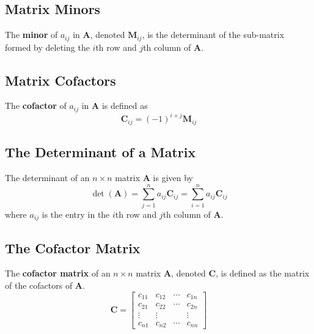 \documentclass{article}
\begin{document}
\subsection{Matrix Minors}
\begin{definition}
    The \textbf{minor} of \(a_{ij}\) in \(\symbf{A}\), denoted
    \(\symbf{M}_{ij}\), is the determinant of the sub-matrix formed by deleting
    the \(i\)th row and \(j\)th column of \(\symbf{A}\).
\end{definition}
\subsection{Matrix Cofactors}
\begin{definition}
    The \textbf{cofactor} of \(a_{ij}\) in \(\symbf{A}\) is defined as
    \begin{equation*}
        \symbf{C}_{ij} = \left( -1 \right)^{i+j} \symbf{M}_{ij}
    \end{equation*}
\end{definition}
\subsection{The Determinant of a Matrix}
\begin{theorem}
    The determinant of an \(n\times n\) matrix \(\symbf{A}\) is given
    by
    \begin{equation*}
        \det{\left( \symbf{A} \right)} = \sum_{j=1}^n a_{ij}\symbf{C}_{ij} = \sum_{i=1}^n a_{ij}\symbf{C}_{ij}
    \end{equation*}
    where \(a_{ij}\) is the entry in the \(i\)th row and \(j\)th column
    of \(\symbf{A}\).
\end{theorem}
\subsection{The Cofactor Matrix}
\begin{definition}
    The \textbf{cofactor matrix} of an \(n\times n\) matrix
    \(\symbf{A}\), denoted \(\symbf{C}\), is defined as the matrix
    of the cofactors of \(\symbf{A}\).
    \begin{equation*}
        \symbf{C} =
        \begin{bmatrix}
            c_{11} & c_{12} & \cdots & c_{1n} \\
            c_{21} & c_{22} & \cdots & c_{2n} \\
            \vdots & \vdots &        & \vdots \\
            c_{n1} & c_{n2} & \cdots & c_{nn}
        \end{bmatrix}
    \end{equation*}
\end{definition}
\end{document}
